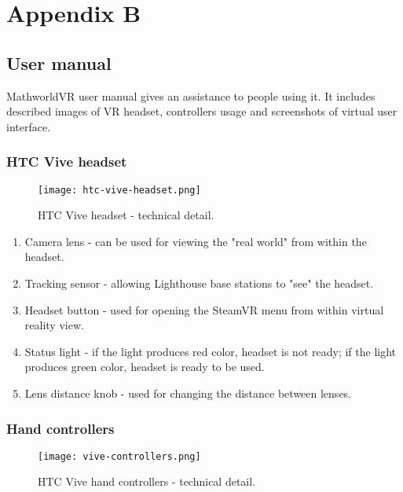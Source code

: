 \section*{Appendix B}
\subsection*{User manual}
MathworldVR user manual gives an assistance to people using it. It includes described images of VR headset, controllers usage and screenshots of virtual user interface.

\subsubsection*{HTC Vive headset}
\begin{figure}[ht!]
\centering
\texttt{[image: htc-vive-headset.png]}
\caption{HTC Vive headset - technical detail. \cite{htc-vive-user-guide}}
\label{r:75}
\end{figure}

\begin{enumerate}
\item{Camera lens - can be used for viewing the "real world" from within the headset.}
\item{Tracking sensor - allowing Lighthouse base stations to "see" the headset.}
\item{Headset button - used for opening the SteamVR menu from within virtual reality view.}
\item{Status light - if the light produces red color, headset is not ready; if the light produces green color, headset is ready to be used.}
\item{Lens distance knob - used for changing the distance between lenses.}
\end{enumerate}

\newpage
\subsubsection*{Hand controllers}
\begin{figure}[ht!]
\centering
\texttt{[image: vive-controllers.png]}
\caption{HTC Vive hand controllers - technical detail. \cite{htc-vive-user-guide}}
\label{r:76}
\end{figure}

